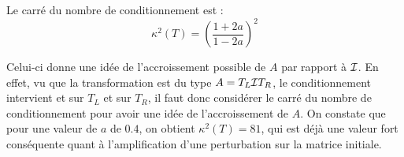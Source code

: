 Le carré du nombre de conditionnement est :
\begin{equation}
	\kappa^2 (T) = \left(\frac{1+2a}{1-2a}\right)^2
\end{equation}

Celui-ci donne une idée de l'accroissement possible de $A$ par rapport à $\mathcal{I}$.
En effet, vu que la transformation est du type $A = T_L \mathcal{I} T_R$,
le conditionnement intervient et sur $T_L$ et sur $T_R$,
il faut donc considérer le carré du nombre de conditionnement pour avoir une idée de l'accroissement de $A$. On constate que pour une valeur de $a$ de $0.4$, on obtient $\kappa^2 (T) = 81$, qui est déjà une valeur fort conséquente quant à l'amplification d'une perturbation sur la matrice initiale.
